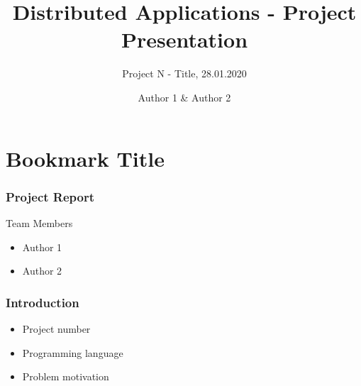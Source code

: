 \documentclass[11pt,t,usepdftitle=false,aspectratio=169]{beamer}
\title[Distributed Applications - Project Presentation]{Distributed Applications - Project Presentation}
\subtitle{Project N  - Title, 28.01.2020}
\author[Author 1 \& Author 2]{Author 1 \& Author 2}
\begin{document}



\section{Bookmark Title}

\begin{frame}
\frametitle{Project Report}
    Team Members
    \begin{itemize}
        \item Author 1
        \item Author 2
    \end{itemize}
\end{frame}

\begin{frame}
\frametitle{Introduction}
    \begin{itemize}
        \item Project number
        \item Programming language
        \item Problem motivation
    \end{itemize}
\end{frame}
\end{document}

